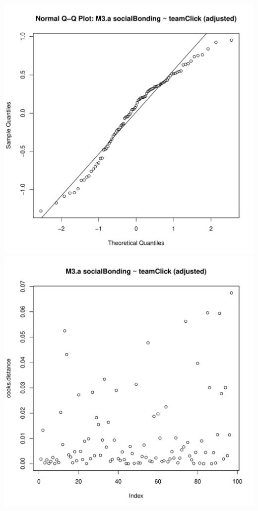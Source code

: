 \documentclass[12pt]{report}
\begin{document}
\includegraphics[scale =.4]{../images/MLM3aOutQQNorm.pdf}
\includegraphics[scale =.4]{../images/MLM3aOutCooksD.pdf}
\end{document}
